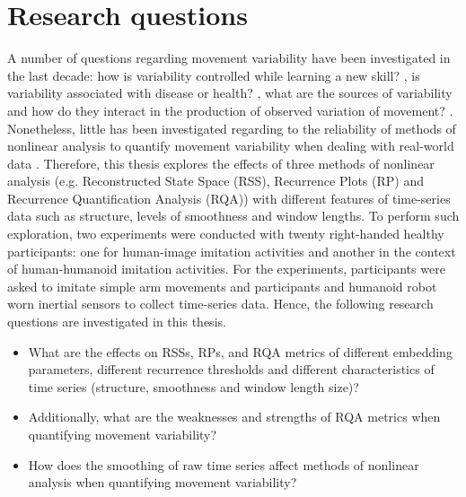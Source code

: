 \section{Research questions}
A number of questions regarding movement variability have been 
investigated in the last decade:
how is variability controlled 
while learning a new skill? \citep{wagner2012, seifert2011, bartlett2007}, 
is variability associated with disease or health? 
\citep{stergiou2006, stergiou2011}, what are the sources of variability 
and how do they interact in the production of observed variation 
of movement? \citep{preatoni2007, preatoni2010, preatoni2013}.
Nonetheless, little has been investigated regarding to the 
reliability of methods of nonlinear analysis to quantify movement 
variability \citep{iwanski1998, yao2017}
when dealing with real-world data \citep{bradley2015, caballero2014}.
Therefore, this thesis explores the effects of three 
methods of nonlinear analysis 
(e.g. Reconstructed State Space (RSS), Recurrence Plots (RP) and 
Recurrence Quantification Analysis (RQA)) with different features 
of time-series data such as structure, levels of smoothness and window lengths.
To perform such exploration, two experiments were conducted with twenty 
right-handed healthy participants: one for human-image imitation 
activities and another in the context of human-humanoid imitation 
activities.
For the experiments, participants were asked to imitate simple arm movements
and participants and humanoid robot worn inertial sensors to collect 
time-series data. 
Hence, the following research questions are investigated in this thesis.
\begin{itemize}
\item What are the effects on RSSs, RPs, and RQA metrics
	of different embedding parameters, different recurrence thresholds 
	and different characteristics of time series 
	(structure, smoothness and window length size)?

\item Additionally, what are the weaknesses and strengths of 
	RQA metrics when quantifying movement variability?

\item How does the smoothing of raw time series affect 
	methods of nonlinear analysis
	when quantifying movement variability?
\end{itemize}

\newpage
